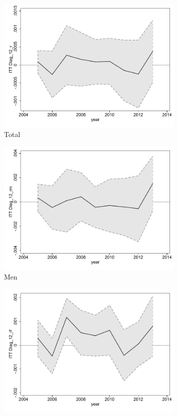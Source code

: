 \documentclass[a4paper ]{article}
\begin{document}
\begin{figure}[h!]
	\centering
	\begin{subfigure}[t]{0.31\textwidth}
		\centering
		\includegraphics[width=0.99\textwidth]{R1_LC_Diag_12_r}
		\caption{Total}		
	\end{subfigure}
	\begin{subfigure}[t]{0.31\textwidth}
		\centering
		\includegraphics[width=0.99\textwidth]{R1_LC_Diag_12_rm}
		\caption{Men}		
	\end{subfigure}
	\quad
	\begin{subfigure}[t]{0.31\textwidth}
		\centering
		\includegraphics[width=0.99\textwidth]{R1_LC_Diag_12_rf}

\end{subfigure}
\end{figure}
\end{document}
